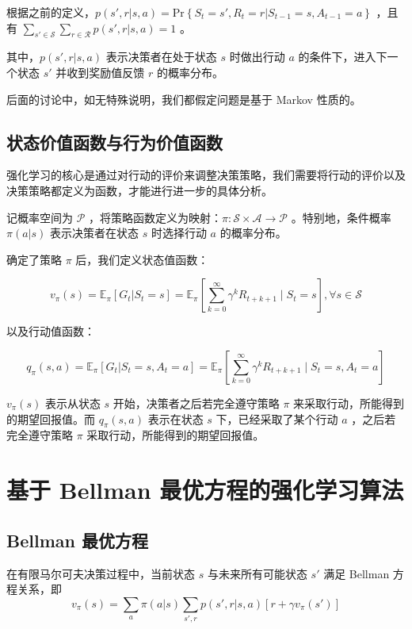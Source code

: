 根据之前的定义，$p(s',r|s,a) =\mathrm{Pr}\left\{S_t=s',R_t=r|S_{t-1}=s,A_{t-1}=a\right\}$ ，且有 $\sum_{s'\in\mathcal{S}}\sum_{r\in\mathcal{R}}p(s',r|s,a)=1$ 。

其中，$p(s',r|s,a)$ 表示决策者在处于状态 $s$ 时做出行动 $a$ 的条件下，进入下一个状态 $s'$ 并收到奖励值反馈 $r$ 的概率分布。

后面的讨论中，如无特殊说明，我们都假定问题是基于 Markov 性质的。

\subsection{状态价值函数与行为价值函数}

强化学习的核心是通过对行动的评价来调整决策策略，我们需要将行动的评价以及决策策略都定义为函数，才能进行进一步的具体分析。

记概率空间为 $\mathcal P$ ，将策略函数定义为映射：$\pi:\mathcal{S}\times\mathcal{A}\to \mathcal{P}$ 。特别地，条件概率 $\pi(a|s)$ 表示决策者在状态 $s$ 时选择行动 $a$ 的概率分布。

确定了策略 $\pi$ 后，我们定义状态值函数：

\begin{equation}
    v_{\pi}(s) =\mathbb{E}_{\pi}\left[G_t|S_t=s\right]=\mathbb{E}_{\pi}\left[\sum_{k=0}^{\infty}\gamma^kR_{t+k+1}\mid S_t=s\right], \forall s \in \mathcal{S}
\end{equation}

以及行动值函数：

\begin{equation}
    q_{\pi}(s,a) =\mathbb{E}_{\pi}\left[G_t|S_t=s,A_t=a\right]=\mathbb{E}_{\pi}\left[\sum_{k=0}^{\infty}\gamma^kR_{t+k+1}\mid S_t=s,A_t=a\right]
\end{equation}

$v_\pi(s)$ 表示从状态 $s$ 开始，决策者之后若完全遵守策略 $\pi$ 来采取行动，所能得到的期望回报值。而 $q_\pi(s,a)$ 表示在状态 $s$ 下，已经采取了某个行动 $a$ ，之后若完全遵守策略 $\pi$ 采取行动，所能得到的期望回报值。

\section{基于 Bellman 最优方程的强化学习算法}

\subsection{Bellman 最优方程}

\begin{Theorem}
    在有限马尔可夫决策过程中，当前状态 $s$ 与未来所有可能状态 $s'$ 满足 Bellman 方程关系，即
    \begin{equation}
        v_{\pi}(s) = \sum_a\pi(a|s)\sum_{s',r}p(s',r|s,a)\left[r+\gamma v_\pi(s') \right]
    \end{equation}
\end{Theorem}

